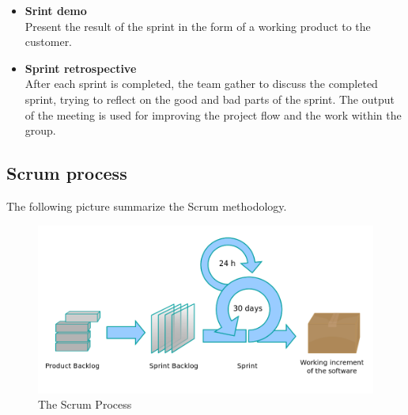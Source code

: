 \begin{itemize}
\item{\textbf{Srint demo}}\\
Present the result of the sprint in the form of a working product to the customer.

\item{\textbf{Sprint retrospective}}\\
After each sprint is completed, the team gather to discuss the completed sprint, trying to reflect on the good and bad parts
of the sprint. The output of the meeting is used for improving the project flow and the work within the group.
\end{itemize}

\pagebreak

\subsection{Scrum process}
The following picture summarize the Scrum methodology.

\begin{figure}[!h]
\centering
\includegraphics[scale=0.35]{graphics/scrum.png}
\caption{The Scrum Process}\label{fig:scrum_process}
\end{figure}
